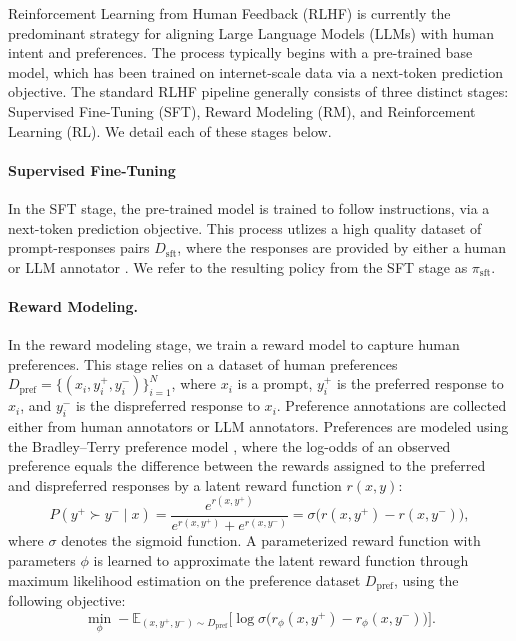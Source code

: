 Reinforcement Learning from Human Feedback (RLHF) \citep{Christiano2017DeepRL,Ouyang2022TrainingLM} is currently the predominant strategy for aligning Large Language Models (LLMs) with human intent and preferences. The process typically begins with a pre-trained base model, which has been trained on internet-scale data via a next-token prediction objective. The standard RLHF pipeline generally consists of three distinct stages: Supervised Fine-Tuning (SFT), Reward Modeling (RM), and Reinforcement Learning (RL). We detail each of these stages below.

\paragraph{Supervised Fine-Tuning} In the SFT stage, the pre-trained model is trained to follow instructions, via a next-token prediction objective. This process utlizes a high quality dataset of prompt-responses pairs $D_\mathrm{sft}$, where the responses are provided by either a human or LLM annotator \citep{Bai2022ConstitutionalAH}. We refer to the resulting policy from the SFT stage as $\pi_\mathrm{sft}$.

\paragraph{Reward Modeling.}
In the reward modeling stage, we train a reward model to capture human preferences. This stage relies on a dataset of human preferences $D_{\mathrm{pref}} = \{(x_i, y_i^+, y_i^-)\}_{i=1}^N$, where $x_i$ is a prompt, $y_i^+$ is the preferred response to $x_i$, and $y_i^-$ is the dispreferred response to $x_i$. Preference annotations are collected either from human annotators or LLM annotators. Preferences are modeled using the Bradley--Terry preference model \citep{bradley1952rank}, where the log-odds of an observed preference equals the difference between the rewards assigned to the preferred and dispreferred responses by a latent reward function $r(x,y)$:
\begin{equation}
  P(y^+ \succ y^- \mid x)
  =
  \frac{e^{r(x,y^+)}}{e^{r(x,y^+)} + e^{r(x,y^-)}}
  =
  \sigma\big(r(x,y^+) - r(x,y^-)\big),
\end{equation}
where $\sigma$ denotes the sigmoid function. A parameterized reward function with parameters $\phi$ is learned to approximate the latent reward function through maximum likelihood estimation on the preference dataset $D_{\mathrm{pref}}$, using the following objective:
\begin{equation}
  \min_{\phi}
  -\mathbb{E}_{(x,y^{+},y^{-}) \sim D_\mathrm{pref}}
  \big[
    \log \sigma\big(r_{\phi}(x,y^+) - r_{\phi}(x,y^-)\big)
  \big].
  \label{eq:bt_rm_loss}
\end{equation}

